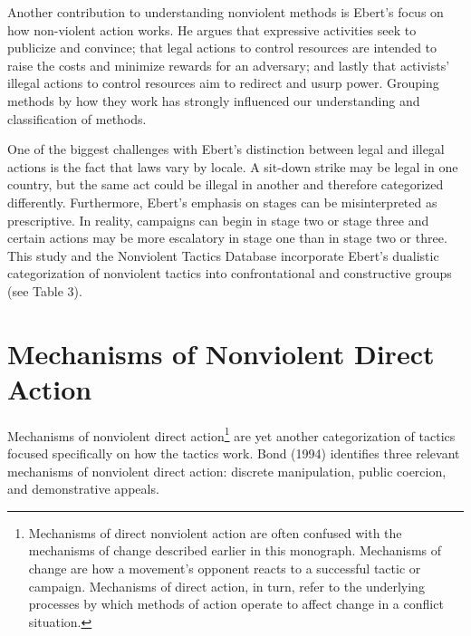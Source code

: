 \documentclass[twoside,a4paper,12pt,fleqn,openany]{extbook}
\begin{document}
Another contribution to understanding nonviolent methods is Ebert’s focus on how non-violent action works. He argues that expressive activities seek to publicize and convince; that legal actions to control resources are intended to raise the costs and minimize rewards for an adversary; and lastly that activists’ illegal actions to control resources aim to redirect and usurp power. Grouping methods by how they work has strongly influenced our understanding and classification of methods.

One of the biggest challenges with Ebert’s distinction between legal and illegal actions is the fact that laws vary by locale. A sit-down strike may be legal in one country, but the same act could be illegal in another and therefore categorized differently. Furthermore, Ebert’s emphasis on stages can be misinterpreted as prescriptive. In reality, campaigns can begin in stage two or stage three and certain actions may be more escalatory in stage one than in stage two or three. This study and the Nonviolent Tactics Database incorporate Ebert’s dualistic categorization of nonviolent tactics into confrontational and constructive groups (see Table 3).

\section*{Mechanisms of Nonviolent Direct Action}

Mechanisms of nonviolent direct action\footnote{Mechanisms of direct nonviolent action are often confused with the mechanisms of change described earlier in this monograph. Mechanisms of change are how a movement’s opponent reacts to a successful tactic or campaign. Mechanisms of direct action, in turn, refer to the underlying processes by which methods of action operate to affect change in a conflict situation.} are yet another categorization of tactics focused specifically on how the tactics work. Bond (1994) identifies three relevant mechanisms of nonviolent direct action: discrete manipulation, public coercion, and demonstrative appeals.
\end{document}

